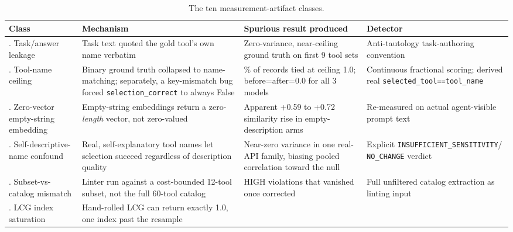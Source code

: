 \documentclass[11pt]{article}
\begin{document}
{\small
\begin{longtable}{@{}>{\raggedright\arraybackslash}p{2.1cm}>{\raggedright\arraybackslash}p{4.4cm}>{\raggedright\arraybackslash}p{4.1cm}>{\raggedright\arraybackslash}p{3.4cm}@{}}
\caption{The ten measurement-artifact classes.
\label{tab:taxonomy}} \\
\toprule
Class & Mechanism & Spurious result produced & Detector \\
\midrule
\endhead
1. Task/answer leakage & Task text quoted the gold tool's own name verbatim & Zero-variance,
  near-ceiling ground truth on first 9 tool sets & Anti-tautology task-authoring convention \\
2. Tool-name ceiling & Binary ground truth collapsed to name-matching; separately, a key-mismatch
  bug forced \texttt{selection\_\allowbreak correct} to always False & 44\% of records tied at
  ceiling 1.0; before=after=0.0 for all 3 models & Continuous fractional scoring; derived real
  \texttt{selected\_\allowbreak tool==tool\_\allowbreak name} \\
3. Zero-vector empty-string embedding & Empty-string embeddings return a zero-\emph{length}
  vector, not zero-valued & Apparent +0.59 to +0.72 similarity rise in empty-description arms &
  Re-measured on actual agent-visible prompt text \\
4. Self-descriptive-name confound & Real, self-explanatory tool names let selection succeed
  regardless of description quality & Near-zero variance in one real-API family, biasing pooled
  correlation toward the null & Explicit \texttt{INSUFFICIENT\_\allowbreak SENSITIVITY}/
  \texttt{NO\_\allowbreak CHANGE} verdict \\
5. Subset-vs-catalog mismatch & Linter run against a cost-bounded 12-tool subset, not the full
  60-tool catalog & 11 HIGH violations that vanished once corrected & Full unfiltered catalog
  extraction as linting input \\
6. LCG index saturation & Hand-rolled LCG can return exactly 1.0, one index past the resample

\end{longtable}}
\end{document}
